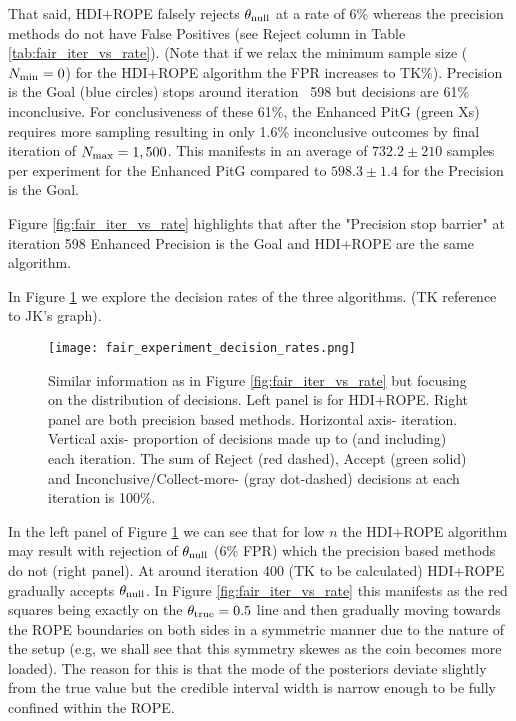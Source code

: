 That said, HDI+ROPE falsely rejects $\theta_{\rm null}$ at a rate of 6\% 
whereas the precision methods do not have False Positives
(see Reject column in Table \ref{tab:fair_iter_vs_rate}).
(Note that if we relax the minimum sample size ($N_{\rm min}=0$) for the HDI+ROPE
algorithm the FPR increases to TK\%).
Precision is the Goal (blue circles) stops around iteration ~598 but decisions are 61\% inconclusive.
For conclusiveness of these 61\%, the Enhanced PitG (green Xs) requires more sampling 
resulting in only 1.6\% inconclusive outcomes by final iteration of $N_{\rm max}=1,500$.
This manifests in an average of $732.2\pm 210$ samples per experiment for the Enhanced PitG
compared to $598.3\pm 1.4$ for the Precision is the Goal.

Figure \ref{fig:fair_iter_vs_rate} highlights that after the "Precision stop barrier" at iteration 598 Enhanced Precision is the Goal and HDI+ROPE are the same algorithm.

In Figure \ref{fig:fair_decisions} we explore the decision rates of the three algorithms.
(TK reference to JK's graph).

\begin{figure}[h!]
  \centering
  \texttt{[image: fair\_experiment\_decision\_rates.png]}
  \caption{Similar information as in Figure \ref{fig:fair_iter_vs_rate} but focusing on
  the distribution of decisions. Left panel is for HDI+ROPE. Right panel are both
  precision based methods. Horizontal axis- iteration. Vertical axis- proportion of
  decisions made up to (and including) each iteration. The sum of Reject (red dashed),
  Accept (green solid) and Inconclusive/Collect-more- (gray dot-dashed) decisions at
  each iteration is 100\%.
  }
  \label{fig:fair_decisions}
\end{figure}

In the left panel of Figure \ref{fig:fair_decisions} we can see that for low $n$ the HDI+ROPE algorithm may result with rejection of
$\theta_{\rm null}$ ($6\%$ FPR) which the precision based methods do not (right panel).
At around iteration 400 (TK to be calculated) HDI+ROPE
gradually accepts $\theta_{\rm null}$. In Figure \ref{fig:fair_iter_vs_rate}
this manifests as the red squares being exactly on the $\theta_{\rm true}=0.5$ line
and then gradually moving towards the ROPE boundaries on both sides in a symmetric
manner due to the nature of the setup (e.g, we shall see that this symmetry
skewes as the coin becomes more loaded). The reason for this is that the mode of
the posteriors deviate slightly from the true value but the credible interval width
is narrow enough to be fully confined within the ROPE.

